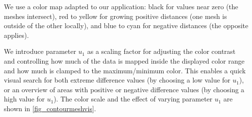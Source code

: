 %
We use a color map adapted to our application:
%
black for values near zero (the meshes intersect), red to yellow for growing
positive distances (one mesh is outside of the other locally), and blue to cyan
for negative distances (the opposite applies).
%

%
We introduce parameter $u_1$ as a scaling factor for adjusting the color
contrast and controlling how much of the data is mapped inside the displayed
color range and how much is clamped to the maximum/minimum color.
%
This enables a quick visual search for both extreme difference values (by
choosing a low value for $u_1$), or an overview of areas with positive or
negative difference values (by choosing a high value for $u_1$).
%
The color scale and the effect of varying parameter $u_1$ are shown in
\cref{fig_contourmeshvis}.
%

